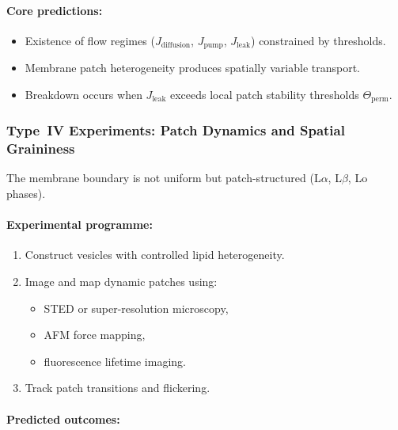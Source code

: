 \paragraph{Core predictions:}

\begin{itemize}
    \item Existence of flow regimes ($J_{\mathrm{diffusion}}$,
          $J_{\mathrm{pump}}$, $J_{\mathrm{leak}}$) constrained by thresholds.
    \item Membrane patch heterogeneity produces spatially variable transport.
    \item Breakdown occurs when
          $J_{\mathrm{leak}}$ exceeds local patch stability thresholds
          $\Theta_{\mathrm{perm}}$.
\end{itemize}



\subsubsection{Type~IV Experiments: Patch Dynamics and Spatial Graininess}

The membrane boundary is not uniform but patch-structured (L$\alpha$, L$\beta$,
Lo phases).

\paragraph{Experimental programme:}

\begin{enumerate}
    \item Construct vesicles with controlled lipid heterogeneity.
    \item Image and map dynamic patches using:
          \begin{itemize}
              \item STED or super-resolution microscopy,
              \item AFM force mapping,
              \item fluorescence lifetime imaging.
          \end{itemize}
    \item Track patch transitions and flickering.
\end{enumerate}

\paragraph{Predicted outcomes:}

